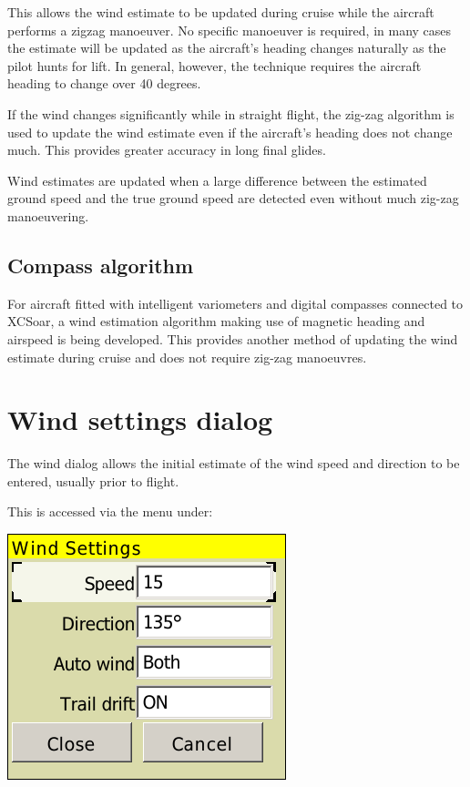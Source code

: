 \documentclass[a4paper,12pt]{refrep}
\begin{document}
This allows the wind estimate to be updated during cruise while the
aircraft performs a zigzag manoeuver.  No specific manoeuver is
required, in many cases the estimate will be updated as the aircraft's
heading changes naturally as the pilot hunts for lift.  In general,
however, the technique requires the aircraft heading to change over 40
degrees.

If the wind changes significantly while in straight flight, the
zig-zag algorithm is used to update the wind estimate even if the
aircraft's heading does not change much. This provides greater
accuracy in long final glides.

Wind estimates are updated when a large difference between the
estimated ground speed and the true ground speed are detected even
without much zig-zag manoeuvering.

\subsection*{Compass algorithm}

For aircraft fitted with intelligent variometers and digital compasses
connected to XCSoar, a wind estimation algorithm making use of
magnetic heading and airspeed is being developed.  This provides
another method of updating the wind estimate during cruise and does
not require zig-zag manoeuvres.

\section{Wind settings dialog}

The wind dialog allows the initial estimate of the wind speed and
direction to be entered, usually prior to flight.

This is accessed via the menu under:
\begin{quote}
\blink{}
\end{quote}

\begin{center}
\includegraphics[angle=0,width=0.4\linewidth,keepaspectratio='true']{figures/dialog-wind2.png}
\end{center}
\end{document}

